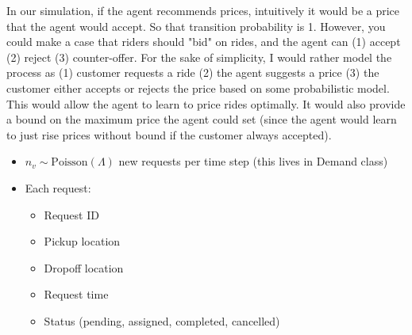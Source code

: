 \documentclass[12pt]{article}
\begin{document}
In our simulation, if the agent recommends prices, intuitively it would be a price that the agent
would accept. So that transition probability is 1. However, you could make a case that riders
should "bid" on rides, and the agent can (1) accept (2) reject (3) counter-offer. For the sake
of simplicity, I would rather model the process as (1) customer requests a ride (2) the agent
suggests a price (3) the customer either accepts or rejects the price based on some
probabilistic model. This would allow the agent to learn to price rides optimally. It would also
provide a bound on the maximum price the agent could set (since the agent would learn to just rise
prices without bound if the customer always accepted).

\begin{itemize}
		\item $n_v \sim \mathrm{Poisson}(\Lambda)$ new requests per time step (this lives in Demand class)
		\item Each request:
				\begin{itemize}
						\item Request ID
						\item Pickup location
						\item Dropoff location
						\item Request time
						\item Status (pending, assigned, completed, cancelled)
				\end{itemize}
\end{itemize}
\end{document}
